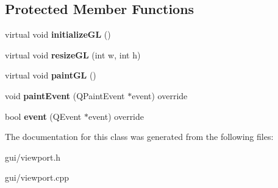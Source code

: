 \subsection*{Protected Member Functions}
\begin{DoxyCompactItemize}
\item 
\mbox{\label{classmgs_1_1render_1_1ViewPort_af0b0f8d6ddd4a4e3f588e43ecd63400c}} 
virtual void {\bfseries initialize\+GL} ()
\item 
\mbox{\label{classmgs_1_1render_1_1ViewPort_a81be6367e33d0164f36fc5970b9736ee}} 
virtual void {\bfseries resize\+GL} (int w, int h)
\item 
\mbox{\label{classmgs_1_1render_1_1ViewPort_a926fdab4fa698afc29f1e37a9633510f}} 
virtual void {\bfseries paint\+GL} ()
\item 
\mbox{\label{classmgs_1_1render_1_1ViewPort_a9a2f33944eb2de7f823bbdb3d6cfc56b}} 
void {\bfseries paint\+Event} (Q\+Paint\+Event $\ast$event) override
\item 
\mbox{\label{classmgs_1_1render_1_1ViewPort_afc88527a95f46869316703c004293fe2}} 
bool {\bfseries event} (Q\+Event $\ast$event) override
\end{DoxyCompactItemize}


The documentation for this class was generated from the following files\+:\begin{DoxyCompactItemize}
\item 
gui/viewport.\+h\item 
gui/viewport.\+cpp\end{DoxyCompactItemize}

